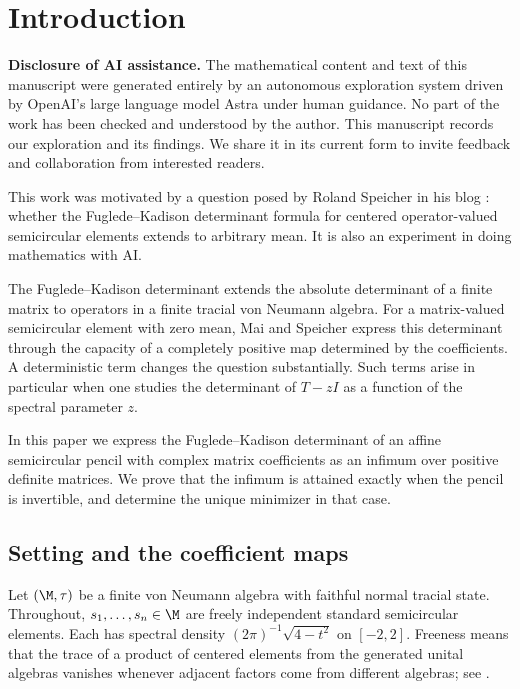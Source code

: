 \section{Introduction}\label{sec:introduction}

\noindent\textbf{Disclosure of AI assistance.}
The mathematical content and text of this manuscript were generated entirely by an autonomous exploration system driven by OpenAI's large language model Astra under human guidance.
No part of the work has been checked and understood by the author.
This manuscript records our exploration and its findings.
We share it in its current form to invite feedback and collaboration from interested readers.
\medskip

This work was motivated by a question posed by Roland Speicher in his blog \cite{Spe26}: whether the Fuglede--Kadison determinant formula for centered operator-valued semicircular elements extends to arbitrary mean.
It is also an experiment in doing mathematics with AI.
\medskip

The Fuglede--Kadison determinant extends the absolute determinant of a finite matrix to operators in a finite tracial von Neumann algebra.
For a matrix-valued semicircular element with zero mean, Mai and Speicher \cite[Theorem 1.2]{MS24} express this determinant through the capacity of a completely positive map determined by the coefficients.
A deterministic term changes the question substantially.
Such terms arise in particular when one studies the determinant of $T-zI$ as a function of the spectral parameter $z$.

In this paper we express the Fuglede--Kadison determinant of an affine semicircular pencil with complex matrix coefficients as an infimum over positive definite matrices.
We prove that the infimum is attained exactly when the pencil is invertible, and determine the unique minimizer in that case.

\subsection{Setting and the coefficient maps}
Let $(\M,\tau)$ be a finite von Neumann algebra with faithful normal tracial state.
Throughout, $s_1,\ldots,s_n\in\M$ are freely independent standard semicircular elements.
Each has spectral density $(2\pi)^{-1}\sqrt{4-t^2}$ on $[-2,2]$.
Freeness means that the trace of a product of centered elements from the generated unital algebras vanishes whenever adjacent factors come from different algebras;
see \cite[Section 1.11 and Chapter 2, Section 2]{MS17}.

